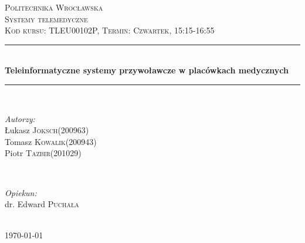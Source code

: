 \documentclass[12pt]{article} %
\begin{document}

\begin{titlepage}

\newcommand{\HRule}{\rule{\linewidth}{0.5mm}} %

\center %

\textsc{\LARGE Politechnika Wrocławska}\\[1.5cm] %
\textsc{\Large Systemy telemedyczne}\\[0.5cm] %
\textsc{\large Kod kursu: TLEU00102P, Termin: Czwartek, 15:15-16:55}\\[0.5cm] %

\HRule \\[0.4cm]
{ \huge \bfseries Teleinformatyczne systemy przywoławcze w placówkach medycznych}\\[0.4cm] %
\HRule \\[1.5cm]

\begin{minipage}{0.4\textwidth}
\begin{flushleft} \large
\emph{Autorzy:}\\
Łukasz \textsc{Joksch}(200963) \\
Tomasz \textsc{Kowalik}(200943) \\
Piotr \textsc{Tazbir}(201029)
\end{flushleft}
\end{minipage}
~
\begin{minipage}{0.4\textwidth}
\begin{flushright} \large
\emph{Opiekun:} \\
dr. Edward \textsc{Puchała} %
\end{flushright}
\end{minipage}\\[4cm]

{\large \today}\\[3cm] %


\vfill %

\end{titlepage}
\end{document}

